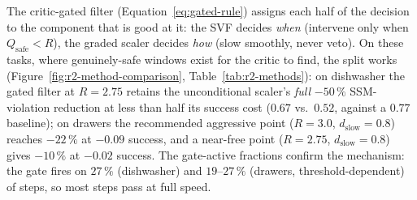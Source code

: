 \documentclass[11pt,a4paper]{report}
\newcommand{\ssm}{SSM}
\begin{document}
The critic-gated filter (Equation~\ref{eq:gated-rule}) assigns each
half of the decision to the component that is good at it: the SVF
decides \emph{when} (intervene only when $Q_{\mathrm{safe}} < R$),
the graded scaler decides \emph{how} (slow smoothly, never veto).
On these tasks, where genuinely-safe windows exist for the critic to
find, the split works
(Figure~\ref{fig:r2-method-comparison},
Table~\ref{tab:r2-methods}): on dishwasher the gated filter at
$R = 2.75$ retains the unconditional scaler's \emph{full} $-50\,\%$
\ssm{}-violation reduction at less than half its success cost
($0.67$ vs.\ $0.52$, against a $0.77$ baseline); on drawers the
recommended aggressive point ($R = 3.0$, $d_{\mathrm{slow}} = 0.8$)
reaches $-22\,\%$ at $-0.09$ success, and a near-free point
($R = 2.75$, $d_{\mathrm{slow}} = 0.8$) gives $-10\,\%$ at $-0.02$
success. The gate-active fractions confirm the mechanism: the gate
fires on $27\,\%$ (dishwasher) and $19$--$27\,\%$ (drawers,
threshold-dependent) of steps, so most steps pass at full speed.
\end{document}
